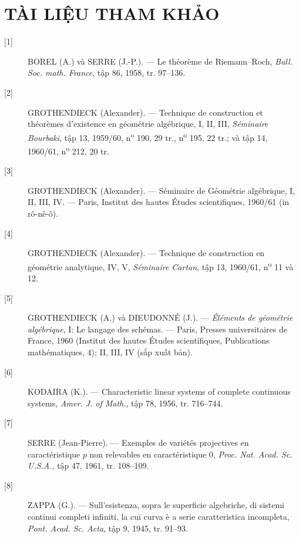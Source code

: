\documentclass[11pt,twoside,openany]{book}
\numberwithin{equation}{section}
\begin{document}
\section*{TÀI LIỆU THAM KHẢO}

\begin{description}
\item[{[1]}] BOREL (A.) và SERRE (J.-P.). --- Le théorème de Riemann--Roch,
\emph{Bull. Soc. math. France}, tập 86, 1958, tr. 97--136.

\item[{[2]}] GROTHENDIECK (Alexander). --- Technique de construction et
théorèmes d'existence en géométrie algébrique, I, II, III, \emph{Séminaire
Bourbaki}, tập 13, 1959/60, n\textsuperscript{o} 190, 29 tr.,
n\textsuperscript{o} 195, 22 tr.; và tập 14, 1960/61,
n\textsuperscript{o} 212, 20 tr.

\item[{[3]}] GROTHENDIECK (Alexander). --- Séminaire de Géométrie algébrique,
I, II, III, IV. --- Paris, Institut des hautes Études scientifiques, 1960/61
(in rô-nê-ô).

\item[{[4]}] GROTHENDIECK (Alexander). --- Technique de construction en
géométrie analytique, IV, V, \emph{Séminaire Cartan}, tập 13, 1960/61,
n\textsuperscript{o} 11 và 12.

\item[{[5]}] GROTHENDIECK (A.) và DIEUDONNÉ (J.). --- \emph{Éléments de
géométrie algébrique}, I: Le langage des schémas. --- Paris, Presses
universitaires de France, 1960 (Institut des hautes Études scientifiques,
Publications mathématiques, 4); II, III, IV (sắp xuất bản).

\item[{[6]}] KODAIRA (K.). --- Characteristic linear systems of complete
continuous systems, \emph{Amer. J. of Math.}, tập 78, 1956, tr. 716--744.

\item[{[7]}] SERRE (Jean-Pierre). --- Exemples de variétés projectives en
caractéristique $p$ non relevables en caractéristique 0, \emph{Proc. Nat. Acad.
Sc. U.S.A.}, tập 47, 1961, tr. 108--109.

\item[{[8]}] ZAPPA (G.). --- Sull'esistenza, sopra le superficie algebriche, di
sistemi continui completi infiniti, la cui curva è a serie caratteristica
incompleta, \emph{Pont. Acad. Sc. Acta}, tập 9, 1945, tr. 91--93.
\end{description}
\end{document}
